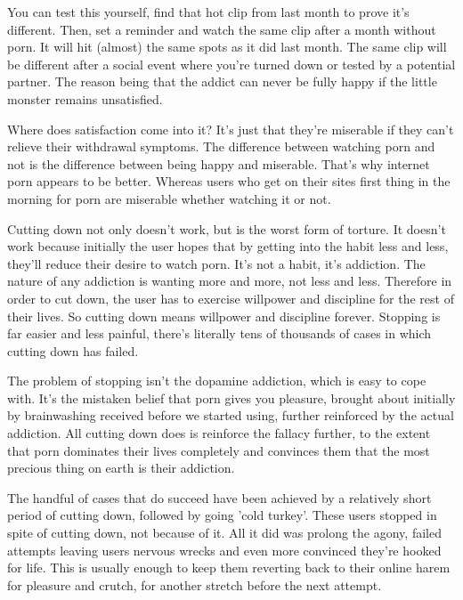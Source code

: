 \documentclass[easypeasy.tex]{subfiles}
\begin{document}
You can test this yourself, find that hot clip from last month to prove it's different. Then, set a reminder and watch the same clip after a month without porn. It will hit (almost) the same spots as it did last month. The same clip will be different after a social event where you're turned down or tested by a potential partner. The reason being that the addict can never be fully happy if the little monster remains unsatisfied.

Where does satisfaction come into it? It's just that they're miserable if they can't relieve their withdrawal symptoms. The difference between watching porn and not is the difference between being happy and miserable. That's why internet porn appears to be better. Whereas users who get on their sites first thing in the morning for porn are miserable whether watching it or not.

Cutting down not only doesn't work, but is the worst form of torture. It doesn't work because initially the user hopes that by getting into the habit less and less, they'll reduce their desire to watch porn. It's not a habit, it's addiction. The nature of any addiction is wanting more and more, not less and less. Therefore in order to cut down, the user has to exercise willpower and discipline for the rest of their lives. So cutting down means willpower and discipline forever. Stopping is far easier and less painful, there's literally tens of thousands of cases in which cutting down has failed.

The problem of stopping isn't the dopamine addiction, which is easy to cope with. It's the mistaken belief that porn gives you pleasure, brought about initially by brainwashing received before we started using, further reinforced by the actual addiction. All cutting down does is reinforce the fallacy further, to the extent that porn dominates their lives completely and convinces them that the most precious thing on earth is their addiction.

The handful of cases that do succeed have been achieved by a relatively short period of cutting down, followed by going 'cold turkey'. These users stopped in spite of cutting down, not because of it. All it did was prolong the agony, failed attempts leaving users nervous wrecks and even more convinced they're hooked for life. This is usually enough to keep them reverting back to their online harem for pleasure and crutch, for another stretch before the next attempt.
\end{document}
